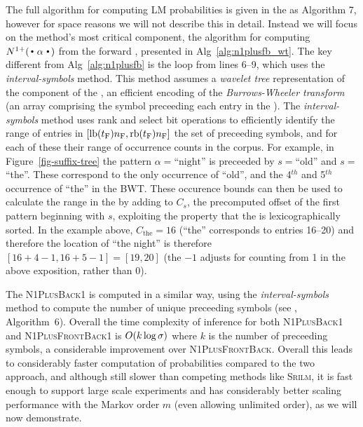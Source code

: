 The full algorithm for computing LM probabilities is given in the \supp as Algorithm 7, however for space reasons we will not describe this in detail.
Instead we will focus on the method's most critical component, the algorithm for computing $\nlplus{\dotpatdot}$ from the forward \CST, presented in Alg~\ref{alg:n1plusfb_wt}.
The key different from Alg~\ref{alg:n1plusfb} is the loop from lines 6--9, which uses the \emph{interval-symbols} method.
This method assumes a \emph{wavelet tree} representation of the \SA component of the \CST, an efficient encoding of the \emph{Burrows-Wheeler transform} (an array comprising the symbol preceeding each entry in the \SA).
The \emph{interval-symbols} method uses rank and select bit operations to efficiently identify the range of \SA entries in $[\text{lb}(t_{\text{F}}){n_{\text{F}}}, \text{rb}(t_{\text{F}}){n_{\text{F}}}]$ the set of preceeding symbols, and for each of these their range of occurrence counts in the corpus.
For example, in Figure~\ref{fig-suffix-tree} the pattern $\alpha=\text{``night''}$ is preceeded by $s=$``old'' and $s=$``the''.
These correspond to the only occurrence of ``old'', and the 4$^{th}$ and 5$^{th}$ occurrence of ``the'' in the BWT.
These occurence bounds can then be used to calculate the range in the \SA by adding to $C_s$, the precomputed offset of the first pattern beginning with $s$, exploiting the property that the \SA is lexicographically sorted.
In the example above, $C_{\text{the}} = 16$ (``the'' corresponds to \SA entries 16--20) and therefore the location of ``the night'' is therefore $[16+4-1,16+5-1] = [19,20]$ (the $-1$ adjusts for counting from 1 in the above exposition, rather than 0).


The \textsc{N1PlusBack1} is computed in a similar way, using the \emph{interval-symbols} method to compute the number of unique preceeding symbols (see \supp, Algorithm~6).
Overall the time complexity of inference for both \textsc{N1PlusBack1} and \textsc{N1PlusFrontBack1} is $O(k \log \sigma)$ where $k$ is the number of preceeding symbols, a considerable improvement over  \textsc{N1PlusFrontBack}.
Overall this leads to considerably faster computation of \ngram probabilities compared to the two \CST approach, and although still slower than competing methods like \textsc{Srilm}, it is fast enough to support large scale experiments and has considerably better scaling performance with the Markov order $m$ (even allowing unlimited order), as we will now demonstrate.


